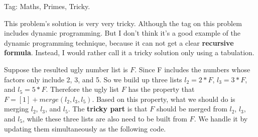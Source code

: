 \documentclass[11pt]{article}
\begin{document}
Tag: Maths, Primes, Tricky.

This problem's solution is very very tricky.
Although the tag on this problem includes dynamic programming. 
But I don't think it's a good example of the dynamic programming technique, because it can not get a clear \textbf{recursive formula}.
Instead, I would rather call it a tricky solution only using a tabulation. 

Suppose the resulted ugly number list is $F$. 
Since F includes the numbers whose factors only include 2, 3, and 5. 
So we build up three lists $l_2=2*F$, $l_3=3*F$, and $l_5=5*F$.
Therefore the ugly list $F$ has the property that $F=[1]+ merge(l_2,l_3,l_5)$.
Based on this property, what we should do is merging $l_2$, $l_3$, and $l_5$. 
The \textbf{tricky part} is that $F$ should be merged from $l_2$, $l_3$, and $l_5$, while these three lists are also need to be built from $F$.
We handle it by updating them simultaneously as the following code. 

\inputminted[breaklines=true,frame=leftline, linenos=true]{python}{src/uglyNumberII.py}

\end{document}
